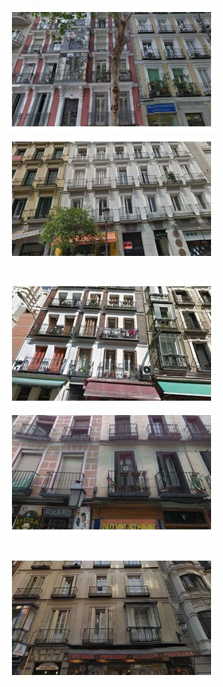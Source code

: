 \begin{figure}[t]
  \begin{minipage}{\linewidth}
    \begin{minipage}{0.3\linewidth}
      \includegraphics[width=0.49\linewidth]{imgs/arch/mosaicsS2/mosaic0000.jpg}
      \includegraphics[width=0.49\linewidth]{imgs/arch/mosaicsS2/mosaic0001.jpg}
      \\ \vspace{-3mm} \\
      \includegraphics[width=0.49\linewidth]{imgs/arch/mosaicsS2/mosaic0002.jpg}
      \includegraphics[width=0.49\linewidth]{imgs/arch/mosaicsS2/mosaic0003.jpg}
      \\ \vspace{-3mm} \\
      \includegraphics[width=0.49\linewidth]{imgs/arch/mosaicsS2/mosaic0004.jpg}

\end{minipage}
\end{minipage}
\end{figure}
